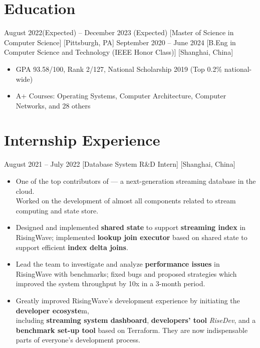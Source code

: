 \documentclass{chicv}
\begin{document}
\begin{basicinfo}
\end{basicinfo}

\section{Education}
  {August 2022(Expected) -- December 2023 (Expected)}
  [Master of Science in Computer Science]
  [Pittsburgh, PA]
  {September 2020 -- June 2024}
  [B.Eng in Computer Science and Technology (IEEE Honor Class)]
  [Shanghai, China]
  \begin{itemize}
    \item GPA 93.58/100, Rank 2/127, National Scholarship 2019 (Top 0.2\% national-wide)
    \item A+ Courses: Operating Systems, Computer Architecture, Computer Networks, and 28 others
  \end{itemize}

\section{Internship Experience}

  {August 2021 – July 2022}
  [Database System R\&D Intern]
  [Shanghai, China]

\begin{itemize}
  \item One of the top contributors of  — a next-generation streaming database in the cloud. \\ Worked on the development of almost all components related to stream computing and state store.
  \item Designed and implemented \textbf{shared state} to support \textbf{streaming index} in RisingWave; implemented \textbf{lookup join executor} based on shared state to support efficient \textbf{index delta joins}.
  \item Lead the team to investigate and analyze \textbf{performance issues} in RisingWave with benchmarks; fixed bugs and proposed strategies which improved the system throughput by 10x in a 3-month period.
  \item Greatly improved RisingWave’s development experience by initiating the \textbf{developer ecosyste}m, \\including \textbf{streaming system dashboard}, \textbf{developers’ tool} \textit{RiseDev}, and a \textbf{benchmark set-up tool} based on Terraform. They are now indispensable parts of everyone’s development process.
\end{itemize}
\end{document}
